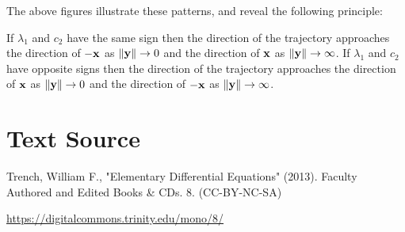 \documentclass{ximera}
\begin{document}



The above figures illustrate these patterns, and
reveal the following principle:
\begin{observation}
If $\lambda_1$ and $c_2$ have the same sign then the
direction of
the trajectory approaches the direction of $-{\bf x}$ as $\left\lVert{\bf y}\right\rVert\rightarrow 0$ and the direction of ${\bf x}$ as $\left\lVert{\bf y}\right\rVert\rightarrow\infty$. If
$\lambda_1$ and $c_2$ have opposite signs then the direction of the
trajectory approaches the direction of ${\bf x}$ as $\left\lVert{\bf y}\right\rVert\rightarrow0$
and the direction of $-{\bf x}$ as $\left\lVert{\bf y}\right\rVert\rightarrow\infty$.
\end{observation}




\section*{Text Source}
Trench, William F., "Elementary Differential Equations" (2013). Faculty Authored and Edited Books \& CDs. 8. (CC-BY-NC-SA)

\href{https://digitalcommons.trinity.edu/mono/8/}{https://digitalcommons.trinity.edu/mono/8/}
\end{document}
